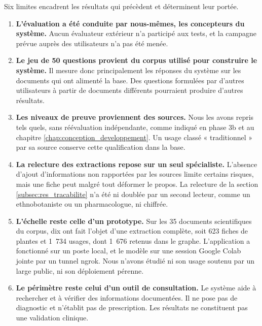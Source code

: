 Six limites encadrent les résultats qui précèdent et déterminent leur portée.

\begin{enumerate}[label=\arabic*.]
    \item \textbf{L'évaluation a été conduite par nous-mêmes, les concepteurs du système.} Aucun évaluateur extérieur n'a participé aux tests, et la campagne prévue auprès des utilisateurs n'a pas été menée.

    \item \textbf{Le jeu de 50 questions provient du corpus utilisé pour construire le système.} Il mesure donc principalement les réponses du système sur les documents qui ont alimenté la base. Des questions formulées par d'autres utilisateurs à partir de documents différents pourraient produire d'autres résultats.

    \item \textbf{Les niveaux de preuve proviennent des sources.} Nous les avons repris tels quels, sans réévaluation indépendante, comme indiqué en phase 3b et au chapitre \ref{chap:conception_developpement}. Un usage classé « traditionnel » par sa source conserve cette qualification dans la base.

    \item \textbf{La relecture des extractions repose sur un seul spécialiste.} L'absence d'ajout d'informations non rapportées par les sources limite certains risques, mais une fiche peut malgré tout déformer le propos. La relecture de la section \ref{subsec:res_tracabilite} n'a été ni doublée par un second lecteur, comme un ethnobotaniste ou un pharmacologue, ni chiffrée.

    \item \textbf{L'échelle reste celle d'un prototype.} Sur les 35 documents scientifiques du corpus, dix ont fait l'objet d'une extraction complète, soit 623 fiches de plantes et 1~734 usages, dont 1~676 retenus dans le graphe. L'application a fonctionné sur un poste local, et le modèle sur une session Google Colab jointe par un tunnel ngrok. Nous n'avons étudié ni son usage soutenu par un large public, ni son déploiement pérenne.

    \item \textbf{Le périmètre reste celui d'un outil de consultation.} Le système aide à rechercher et à vérifier des informations documentées. Il ne pose pas de diagnostic et n'établit pas de prescription. Les résultats ne constituent pas une validation clinique.
\end{enumerate}

